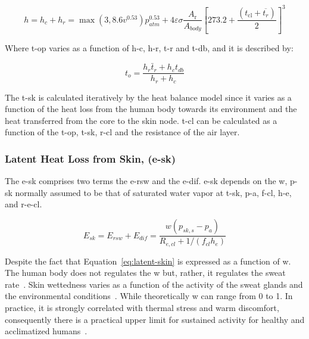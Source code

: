 \begin{equation}
    h=h_{c} + h_{r} = \max(3, 8.6 v^{0.53}) p_{atm}^{0.53} + 4 \varepsilon \sigma \frac{A_{\mathrm{r}}}{A_{body}}\left[273.2+\frac{\left(t_{\mathrm{cl}}+\overline{t_{r}}\right)}{2}\right]^{3}\label{eq:h}
\end{equation}


Where \ac{t-op} varies as a function of \ac{h-c}, \ac{h-r}, \ac{t-r} and \ac{t-db}, and it is described by:

\begin{equation}
    t_{o}=\frac{h_{r} \bar{t}_{r}+h_{c} t_{db}}{h_{r}+h_{c}}\label{eq:t-op}
\end{equation}

The \ac{t-sk} is calculated iteratively by the heat balance model since it varies as a function of the heat loss from the human body towards its environment and the heat transferred from the core to the skin node.
\Ac{t-cl} can be calculated as a function of the \ac{t-op}, \ac{t-sk}, \ac{r-cl} and the resistance of the air layer.

\subsubsection{Latent Heat Loss from Skin, (\acs{e-sk})}

The \acf{e-sk} comprises two terms the \ac{e-rsw} and the \ac{e-dif}.
\ac{e-sk} depends on the \ac{w}, \ac{p-sk} normally assumed to be that of saturated water vapor at \ac{t-sk}, \ac{p-a}, \ac{f-cl}, \ac{h-e}, and \ac{r-e-cl}.

\begin{equation}
    E_{s k}=E_{rsw}+E_{dif}=\frac{w\left(p_{s k, s}-p_{a}\right)}{R_{e, c l}+1 /\left(f_{c l} h_{e}\right)}\label{eq:latent-skin}
\end{equation}

Despite the fact that Equation~\ref{eq:latent-skin} is expressed as a function of \ac{w}.
The human body does not regulates the \ac{w} but, rather, it regulates the sweat rate~\cite{ASHRA2017}.
Skin wettedness varies as a function of the activity of the sweat glands and the environmental conditions~\cite{ASHRA2017}.
While theoretically \ac{w} can range from 0 to 1.
In practice, it is strongly correlated with thermal stress and warm discomfort, consequently there is a practical upper limit for sustained activity for healthy and acclimatized humans~\cite{ASHRA2017}.

